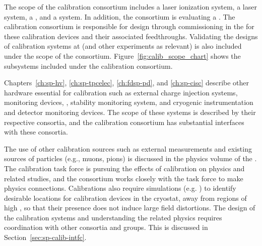 
The scope of the calibration consortium includes a laser ionization system, a \phel laser system, a , and a 
system. In addition, the consortium is evaluating a .
 The calibration consortium is responsible for design through commissioning in the  for these calibration devices and their associated feedthroughs. Validating the designs of calibration systems at  (and other experiments as relevant) is also included under the scope of the consortium. Figure~\ref{fig:calib_scope_chart} shows the subsystems included under the calibration consortium. 

Chapters~\ref{ch:sp-hv}, \ref{ch:sp-tpcelec}, \ref{ch:fdsp-pd}, and \ref{ch:sp-cisc} %
describe other hardware essential for calibration such as  external charge injection systems,  monitoring devices, ,
stability monitoring system, and cryogenic instrumentation and detector monitoring devices. The scope of these systems is described by their respective consortia, and the calibration consortium has substantial interfaces with these consortia. 

The use of other calibration sources such as external measurements and existing sources of particles (e.g., muons, pions) is discussed in the physics volume of the . The calibration task force is pursuing the effects of calibration on physics and related studies, and the consortium works closely with the task force to make physics connections. Calibrations also require simulations (e.g. \efield) to identify desirable locations for calibration devices in the cryostat, away from regions of high \efield, so that their presence does not induce large field distortions. 
The design of the calibration systems and understanding the related physics requires coordination with other consortia and groups. This is discussed in Section~\ref{sec:sp-calib-intfc}.


